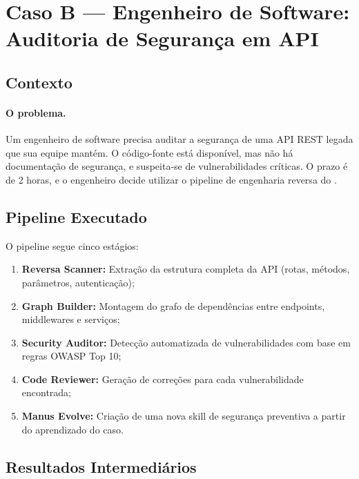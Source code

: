 \section{Caso B — Engenheiro de Software: Auditoria de Segurança em API}
\label{sec:caso-engenheiro}
\nivelavancado

\subsection{Contexto}

\paragraph{O problema.} Um engenheiro de software precisa auditar a
segurança de uma API REST legada que sua equipe mantém. O código-fonte
está disponível, mas não há documentação de segurança, e suspeita-se de
vulnerabilidades críticas. O prazo é de 2 horas, e o engenheiro decide
utilizar o pipeline de engenharia reversa do \opencodeeco{}.

\subsection{Pipeline Executado}

O pipeline segue cinco
estágios:

\begin{enumerate}
    \item \textbf{Reversa Scanner:} Extração da estrutura completa da
          API (rotas, métodos, parâmetros, autenticação);
    \item \textbf{Graph Builder:} Montagem do grafo de dependências
          entre endpoints, middlewares e serviços;
    \item \textbf{Security Auditor:} Detecção automatizada de
          vulnerabilidades com base em regras OWASP Top 10;
    \item \textbf{Code Reviewer:} Geração de correções para cada
          vulnerabilidade encontrada;
    \item \textbf{Manus Evolve:} Criação de uma nova skill de
          segurança preventiva a partir do aprendizado do caso.
\end{enumerate}

\subsection{Resultados Intermediários}

